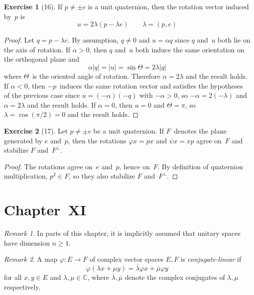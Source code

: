 \documentclass[letterpaper,12pt]{article}
\newcommand{\C}{\mathbb{C}}
\newcommand{\oc}[1]{#1^{\perp}}
\newcommand{\iprod}[2]{(#1,#2)}
\newcommand{\norm}[1]{|#1|}
\newcommand{\conj}[1]{\overline{#1}}
\theoremstyle{definition}
\newtheorem*{exer}{Exercise}
\theoremstyle{remark}
\newtheorem*{rmk}{Remark}
\begin{document}
\begin{exer}[16]
If \(p\ne\pm e\) is a unit quaternion, then the rotation vector induced by~\(p\) is
\[u=2\lambda(p-\lambda e)\qquad\lambda=\iprod{p}{e}\]
\end{exer}
\begin{proof}
Let \(q=p-\lambda e\). By assumption, \(q\ne 0\) and \(u=\alpha q\) since \(q\) and~\(u\) both lie on the axis of rotation. If \(\alpha>0\), then \(q\) and~\(u\) both induce the same orientation on the orthogonal plane and
\[\alpha\norm{q}=\norm{u}=\sin\Theta=2\lambda\norm{q}\]
where \(\Theta\)~is the oriented angle of rotation. Therefore \(\alpha=2\lambda\) and the result holds. If \(\alpha<0\), then \(-p\)~induces the same rotation vector and satisfies the hypotheses of the previous case since \(u=(-\alpha)(-q)\) with \(-\alpha>0\), so \(-\alpha=2(-\lambda)\) and \(\alpha=2\lambda\) and the result holds. If \(\alpha=0\), then \(u=0\) and \(\Theta=\pi\), so \(\lambda=\cos(\pi/2)=0\) and the result holds.
\end{proof}

\begin{exer}[17]
Let \(p\ne\pm e\) be a unit quaternion. If \(F\)~denotes the plane generated by \(e\) and~\(p\), then the rotations \(\varphi x=px\) and \(\psi x=xp\) agree on~\(F\) and stabilize \(F\) and~\(\oc{F}\).
\end{exer}
\begin{proof}
The rotations agree on~\(e\) and~\(p\), hence on~\(F\). By definition of quaternion multiplication, \(p^2\in F\), so they also stabilize \(F\) and~\(\oc{F}\).
\end{proof}

\newpage
\section*{Chapter~XI}
\begin{rmk}
In parts of this chapter, it is implicitly assumed that unitary spaces have dimension \(n\ge 1\).
\end{rmk}

\begin{rmk}
A map \(\varphi:E\to F\) of complex vector spaces \(E,F\) is \emph{conjugate-linear} if
\[\varphi(\lambda x+\mu y)=\conj{\lambda}\varphi x+\conj{\mu}\varphi y\]
for all \(x,y\in E\) and \(\lambda,\mu\in\C\), where \(\conj{\lambda},\conj{\mu}\) denote the complex conjugates of \(\lambda,\mu\) respectively.
\end{rmk}
\end{document}
